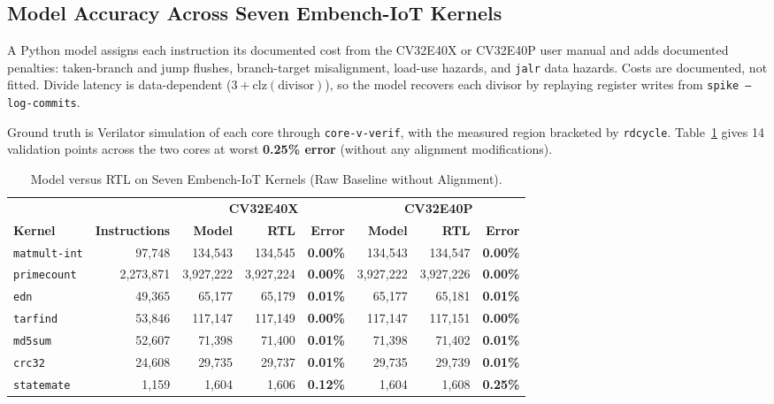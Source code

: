 \documentclass[11pt,a4paper]{article}
\begin{document}
\subsection{Model Accuracy Across Seven Embench-IoT Kernels}
A Python model assigns each instruction its documented cost from the CV32E40X or CV32E40P user manual and adds documented penalties: taken-branch and jump flushes, branch-target misalignment, load-use hazards, and \texttt{jalr} data hazards. Costs are documented, not fitted. Divide latency is data-dependent ($3 + \text{clz}(\text{divisor})$), so the model recovers each divisor by replaying register writes from \texttt{spike --log-commits}.

Ground truth is Verilator simulation of each core through \texttt{core-v-verif}, with the measured region bracketed by \texttt{rdcycle}. Table~\ref{tab:model_validation} gives 14 validation points across the two cores at worst \textbf{0.25\% error} (without any alignment modifications).

\begin{table}[h!]
\centering
\small
\setlength{\tabcolsep}{4.5pt}
\begin{tabular}{l r r r r r r r}
\toprule
& & \multicolumn{3}{c}{\textbf{CV32E40X}} & \multicolumn{3}{c}{\textbf{CV32E40P}} \\
\cmidrule(lr){3-5} \cmidrule(lr){6-8}
\textbf{Kernel} & \textbf{Instructions} & \textbf{Model} & \textbf{RTL} & \textbf{Error} & \textbf{Model} & \textbf{RTL} & \textbf{Error} \\
\midrule
\texttt{matmult-int} & 97,748    & 134,543   & 134,545   & \textbf{0.00\%} & 134,543   & 134,547   & \textbf{0.00\%} \\
\texttt{primecount}  & 2,273,871 & 3,927,222 & 3,927,224 & \textbf{0.00\%} & 3,927,222 & 3,927,226 & \textbf{0.00\%} \\
\texttt{edn}         & 49,365    & 65,177    & 65,179    & \textbf{0.01\%} & 65,177    & 65,181    & \textbf{0.01\%} \\
\texttt{tarfind}     & 53,846    & 117,147   & 117,149   & \textbf{0.00\%} & 117,147   & 117,151   & \textbf{0.00\%} \\
\texttt{md5sum}      & 52,607    & 71,398    & 71,400    & \textbf{0.01\%} & 71,398    & 71,402    & \textbf{0.01\%} \\
\texttt{crc32}       & 24,608    & 29,735    & 29,737    & \textbf{0.01\%} & 29,735    & 29,739    & \textbf{0.01\%} \\
\texttt{statemate}   & 1,159     & 1,604     & 1,606     & \textbf{0.12\%} & 1,604     & 1,608     & \textbf{0.25\%} \\
\bottomrule
\end{tabular}
\caption{Model versus RTL on Seven Embench-IoT Kernels (Raw Baseline without Alignment).}
\label{tab:model_validation}
\end{table}
\end{document}
